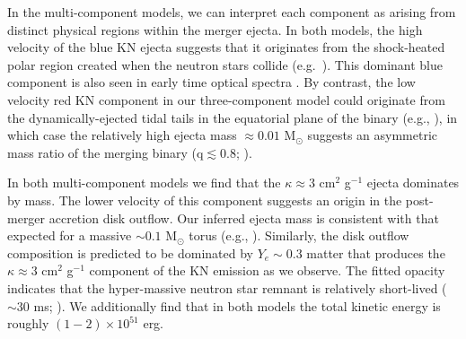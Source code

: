In the multi-component models, we can interpret each component as arising from distinct physical regions within the merger ejecta. In both models, the high velocity of the blue KN ejecta suggests that it originates from the shock-heated polar region created when the neutron stars collide (e.g.~\citealt{Oechslin+07,Bauswein+13a,Sekiguchi+16}). This dominant blue component is also seen in early time optical spectra \citep{Nicholl+17a}. By contrast, the low velocity red KN component in our three-component model could originate from the dynamically-ejected tidal tails in the equatorial plane of the binary (e.g., \citealt{Rosswog+99,Hotokezaka+13}), in which case the relatively high ejecta mass $\approx 0.01$ M$_{\odot}$ suggests an asymmetric mass ratio of the merging binary (q$\lesssim0.8$; \citealt{Hotokezaka+13}).

In both multi-component models we find that the $\kappa\approx 3$ cm$^{2}$ g$^{-1}$ ejecta dominates by mass.  The lower velocity of this component suggests an origin in the post-merger accretion disk outflow.  Our inferred ejecta mass is consistent with that expected for a massive $\sim 0.1$ M$_{\odot}$ torus (e.g., \citealt{Just+15,SiegelMetzger17}).  Similarly, the disk outflow composition is predicted to be dominated by $Y_{e}\sim 0.3$ matter that produces the $\kappa\approx 3$ cm$^{2}$ g$^{-1}$ component of the KN emission \citep{Tanaka+18} as we observe. The fitted opacity indicates that the hyper-massive neutron star remnant is relatively short-lived ($\sim 30$ ms; \citealt{FernandezMetzger13,Just+15,Kasen+15}). We additionally find that in both models the total kinetic energy is roughly $(1-2)\times 10^{51}$ erg.

